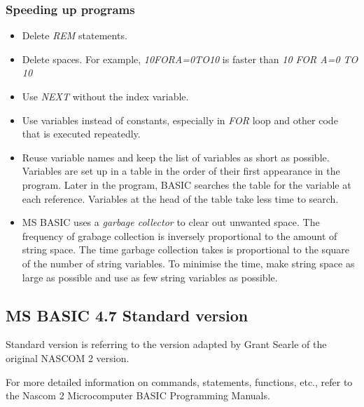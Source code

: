 \documentclass[a4paper,11pt]{article}
\begin{document}
    \subsubsection{Speeding up programs}

    \begin{itemize}
        \item Delete \textit{REM} statements.
        \item Delete spaces. For example, \textit{10FORA=0TO10} is faster than
        \textit{10 FOR A=0 TO 10}
        \item Use \textit{NEXT} without the index variable.
        \item Use variables instead of constants, especially in \textit{FOR}
        loop and other code that is executed repeatedly.
        \item Reuse variable names and keep the list of variables as short as
        possible. Variables are set up in a table in the order of their first
        appearance in the program. Later in the program, BASIC searches the
        table for the variable at each reference. Variables at the head of the
        table take less time to search.
        \item MS BASIC uses a \textit{garbage collector} to clear out unwanted 
        space. The frequency of grabage collection is inversely proportional to
        the amount of string space. The time garbage collection takes is
        proportional to the square of the number of string variables. To
        minimise the time, make string space as large as possible and use as few
        string variables as possible.
    \end{itemize}

    \subsection{MS BASIC 4.7 Standard version}

    Standard version is referring to the version adapted by Grant Searle
    \cite{searle1} of the original NASCOM 2 version.

    For more detailed information on commands, statements, functions, etc.,
    refer to the Nascom 2 Microcomputer BASIC Programming Manuals\cite{nascombasic}.
\end{document}
